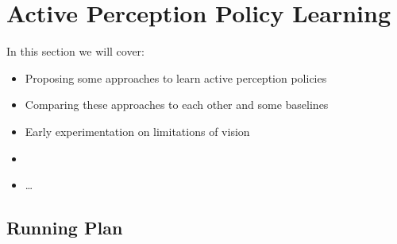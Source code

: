 \chapter{Active Perception Policy Learning}
In this section we will cover:
  \begin{itemize}
    \item Proposing some approaches to learn active perception policies
    \item Comparing these approaches to each other and some baselines 
    \item Early experimentation on limitations of vision
    \item 
    \item \ldots
  \end{itemize}
  
\section{Running Plan}\todo{}

